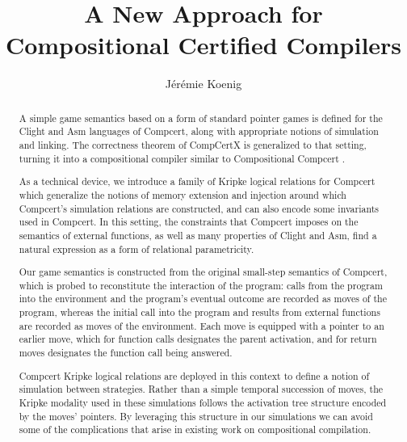 \documentclass[acmsmall,anonymous]{acmart}
\begin{document}
\title{A New Approach for Compositional Certified Compilers}

\author{J\'er\'emie Koenig}

\begin{abstract} %
A simple game semantics based on a form of standard pointer games
is defined for the Clight and Asm languages of Compcert,
along with appropriate notions of simulation and linking.
The correctness theorem of CompCertX \citep{popl15}
is generalized to that setting,
turning it into a compositional compiler
similar to Compositional Compcert \citep{compcomp}.

As a technical device,
we introduce a family of Kripke logical relations for Compcert
which generalize the notions of memory extension and injection
around which Compcert's simulation relations are constructed,
and can also encode some invariants used in Compcert.
In this setting,
the constraints that Compcert imposes on the semantics of external functions,
as well as many properties of Clight and Asm,
find a natural expression as a form of relational parametricity.

Our game semantics is constructed from the original
small-step semantics of Compcert,
which is probed to reconstitute the interaction of the program:
calls from the program into the environment and
the program's eventual outcome
are recorded as moves of the program,
whereas the initial call into the program and
results from external functions
are recorded as moves of the environment.
Each move is equipped with a pointer to an earlier move,
which for function calls designates the parent activation,
and for return moves designates the function call being answered.

Compcert Kripke logical relations are deployed in this context
to define a notion of simulation between strategies.
Rather than a simple temporal succession of moves,
the Kripke modality used in these simulations
follows the activation tree structure
encoded by the moves' pointers.
By leveraging this structure in our simulations
we can avoid some of the complications
that arise in existing work on compositional compilation.
\end{abstract}

\maketitle
\end{document}
